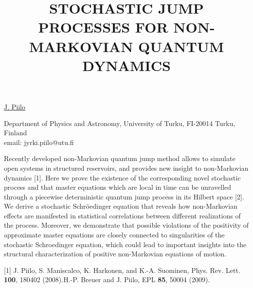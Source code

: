 \title{STOCHASTIC JUMP PROCESSES FOR NON-MARKOVIAN QUANTUM DYNAMICS}

\underline{J. Piilo}


Department of Physics and Astronomy, University of Turku, FI-20014 Turku, Finland\\
email: jyrki.piilo@utu.fi

Recently developed non-Markovian quantum jump method allows to simulate open systems in structured reservoirs, and
provides new insight to non-Markovian dynamics [1]. Here we prove the existence of the corresponding novel stochastic process
and that master equations which are local in time can be unravelled through a piecewise deterministic quantum jump process in
its Hilbert space [2]. We derive a stochastic Schr\"{o}edinger equation that reveals how non-Markovian effects are manifested in
statistical correlations between different realizations of the process. Moreover, we demonstrate that possible violations of the
positivity of approximate master equations are closely connected to singularities of the stochastic Schroedinger equation, which
could lead to important insights into the structural characterization of positive non-Markovian equations of motion.

[1] J. Piilo, S. Maniscalco, K. Harkonen, and K.-A. Suominen, Phys. Rev. Lett. \textbf{100}, 180402 (2008).\newline
[2] H.-P. Breuer and J. Piilo, EPL \textbf{85}, 50004 (2009).\newline

\vspace{\baselineskip}